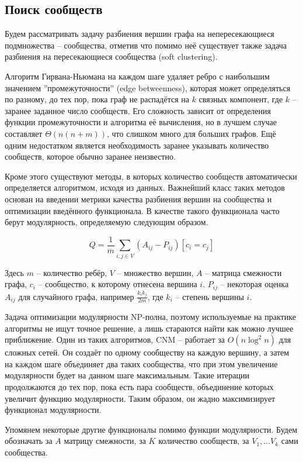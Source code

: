 \documentclass{article}
\begin{document}
\subsection*{Поиск сообществ}

Будем рассматривать задачу разбиения вершин графа на непересекающиеся подмножества -- сообщества, отметив что помимо неё существует также задача разбиения на пересекающиеся сообщества (soft clustering).


Алгоритм Гирвана-Ньюмана на каждом шаге удаляет ребро с наибольшим значением ''промежуточности'' (edge betweenness), которая может определяться по разному, до тех пор, пока граф не распадётся на $k$ связных компонент, где $k$ -- заранее заданное число сообществ\cite{gm_alg}. Его сложность зависит от определения функции промежуточности и алгоритма её вычисления, но в лучшем случае составляет $\Theta(n (n+m))$, что слишком много для больших графов. Ещё одним недостатком является необходимость заранее указывать количество сообществ, которое обычно заранее неизвестно.

Кроме этого существуют методы, в которых количество сообществ автоматически определяется алгоритмом, исходя из данных.
Важнейший класс таких методов основан на введении метрики качества разбиения вершин на сообщества и оптимизации введённого функционала. В качестве такого функционала часто берут модулярность, определяемую следующим образом.

$$ Q = \frac{1}{m} \sum_{i,j \in V} (A_{ij} - P_{ij}) [c_i = c_j] $$

Здесь $m$ -- количество ребёр, $V$ -- множество вершин, $A$ -- матрица смежности графа, $c_i$ -- сообщество, к которому отнесена вершина $i$. $P_{ij}$ -- некоторая оценка $A_{ij}$ для случайного графа, например $\frac{k_i k_j}{2m}$, где $k_i$ -- степень вершины $i$.

Задача оптимизации модулярности NP-полна, поэтому используемые на практике алгоритмы не ищут точное решение, а лишь стараются найти как можно лучшее приближение. Один из таких алгоритмов, CNM\cite{greedy_alg} --  работает за $O(n \log^2 n)$ для сложных сетей. Он создаёт по одному сообществу на каждую вершину, а затем на каждом шаге объединяет два таких сообщества, что при этом увеличение модулярности будет на данном шаге максимальным. Такие итерации продолжаются до тех пор, пока есть пара сообществ, объединение которых увеличит функцию модулярности. Таким образом, он жадно максимизирует функционал модулярности.

Упомянем некоторые другие функционалы помимо функции модулярности. Будем обозначать за $A$ матрицу смежности, за $K$ количество сообществ, за $V_1, \dots V_k$ сами сообщества.
\end{document}
